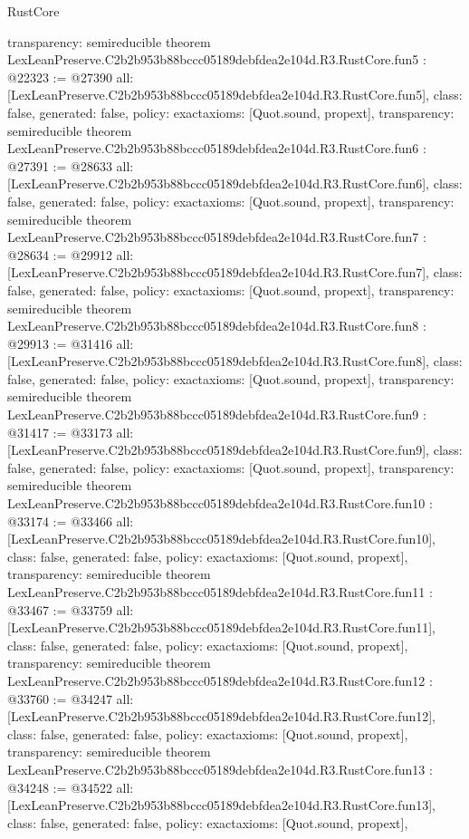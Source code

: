 \begin{lexlean}{RustCore}
\begin{coremodule}
{  transparency: semireducible
}
theorem LexLeanPreserve.C2b2b953b88bccc05189debfdea2e104d.R3.RustCore.fun5 : @22323 := @27390 {
  all: [LexLeanPreserve.C2b2b953b88bccc05189debfdea2e104d.R3.RustCore.fun5],
  class: false,
  generated: false,
  policy: exact{axioms: [Quot.sound, propext]},
  transparency: semireducible
}
theorem LexLeanPreserve.C2b2b953b88bccc05189debfdea2e104d.R3.RustCore.fun6 : @27391 := @28633 {
  all: [LexLeanPreserve.C2b2b953b88bccc05189debfdea2e104d.R3.RustCore.fun6],
  class: false,
  generated: false,
  policy: exact{axioms: [Quot.sound, propext]},
  transparency: semireducible
}
theorem LexLeanPreserve.C2b2b953b88bccc05189debfdea2e104d.R3.RustCore.fun7 : @28634 := @29912 {
  all: [LexLeanPreserve.C2b2b953b88bccc05189debfdea2e104d.R3.RustCore.fun7],
  class: false,
  generated: false,
  policy: exact{axioms: [Quot.sound, propext]},
  transparency: semireducible
}
theorem LexLeanPreserve.C2b2b953b88bccc05189debfdea2e104d.R3.RustCore.fun8 : @29913 := @31416 {
  all: [LexLeanPreserve.C2b2b953b88bccc05189debfdea2e104d.R3.RustCore.fun8],
  class: false,
  generated: false,
  policy: exact{axioms: [Quot.sound, propext]},
  transparency: semireducible
}
theorem LexLeanPreserve.C2b2b953b88bccc05189debfdea2e104d.R3.RustCore.fun9 : @31417 := @33173 {
  all: [LexLeanPreserve.C2b2b953b88bccc05189debfdea2e104d.R3.RustCore.fun9],
  class: false,
  generated: false,
  policy: exact{axioms: [Quot.sound, propext]},
  transparency: semireducible
}
theorem LexLeanPreserve.C2b2b953b88bccc05189debfdea2e104d.R3.RustCore.fun10 : @33174 := @33466 {
  all: [LexLeanPreserve.C2b2b953b88bccc05189debfdea2e104d.R3.RustCore.fun10],
  class: false,
  generated: false,
  policy: exact{axioms: [Quot.sound, propext]},
  transparency: semireducible
}
theorem LexLeanPreserve.C2b2b953b88bccc05189debfdea2e104d.R3.RustCore.fun11 : @33467 := @33759 {
  all: [LexLeanPreserve.C2b2b953b88bccc05189debfdea2e104d.R3.RustCore.fun11],
  class: false,
  generated: false,
  policy: exact{axioms: [Quot.sound, propext]},
  transparency: semireducible
}
theorem LexLeanPreserve.C2b2b953b88bccc05189debfdea2e104d.R3.RustCore.fun12 : @33760 := @34247 {
  all: [LexLeanPreserve.C2b2b953b88bccc05189debfdea2e104d.R3.RustCore.fun12],
  class: false,
  generated: false,
  policy: exact{axioms: [Quot.sound, propext]},
  transparency: semireducible
}
theorem LexLeanPreserve.C2b2b953b88bccc05189debfdea2e104d.R3.RustCore.fun13 : @34248 := @34522 {
  all: [LexLeanPreserve.C2b2b953b88bccc05189debfdea2e104d.R3.RustCore.fun13],
  class: false,
  generated: false,
  policy: exact{axioms: [Quot.sound, propext]},
}
\end{coremodule}
\end{lexlean}
